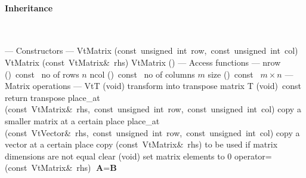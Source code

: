 \documentclass{article}
\begin{document}
\begin{cxxentry}
\begin{cxxclass}
\begin{cxxInheritance}
\paragraph{Inheritance}\strut\smallskip\strut\\
\end{cxxInheritance}
\begin{cxxpublic}
\cxxitem{}
        {--- Constructors --- }
        {}
        {}
        {}
\label{cxx.2.2.1}
\cxxitem{}
        {VtMatrix}
        {(const\ unsigned\ int\ row,\ const\ unsigned\ int\ col)}
        {}
        {}
\label{cxx.2.2.2}
\cxxitem{}
        {VtMatrix}
        {(const\ VtMatrix\&\ rhs)}
        {}
        {}
\label{cxx.2.2.3}
        {\cxxtilde VtMatrix}
        {()}
        {}
        {}
\label{cxx.2.2.4}
\cxxitem{}
        {--- Access functions --- }
        {}
        {}
        {}
\label{cxx.2.2.5}
        {nrow}
        {()\ const\ }
        { no of rows $n$}
        {}
\label{cxx.2.2.6}
        {ncol}
        {()\ const\ }
        { no of columns $m$}
        {}
\label{cxx.2.2.7}
        {size}
        {()\ const\ }
        { $m\times n$}
        {}
\label{cxx.2.2.8}
\cxxitem{}
        {--- Matrix operations --- }
        {}
        {}
        {}
\label{cxx.2.2.9}
        {VtT}
        {(void)}
        { transform into transpose matrix}
        {}
\label{cxx.2.2.10}
        {T}
        {(void)\ const\ }
        { return transpose}
        {}
\label{cxx.2.2.11}
        {place\_at}
        {(const\ VtMatrix\&\ rhs,\ const\ unsigned\ int\ row,\ const\ unsigned\ int\ col)}
        { copy a smaller matrix at a certain place}
        {}
\label{cxx.2.2.12}
        {place\_at}
        {(const\ VtVector\&\ rhs,\ const\ unsigned\ int\ row,\ const\ unsigned\ int\ col)}
        { copy a vector at a certain place}
        {}
\label{cxx.2.2.13}
        {copy}
        {(const\ VtMatrix\&\ rhs)}
        { to be used if matrix dimensions are not equal}
        {}
\label{cxx.2.2.14}
        {clear}
        {(void)}
        { set matrix elements to 0}
        {}
\label{cxx.2.2.15}
        {operator=\ }
        {(const\ VtMatrix\&\ rhs)}
        { $\textbf{A} = \textbf{B}$}

\end{cxxpublic}
\end{cxxclass}
\end{cxxentry}
\end{document}
